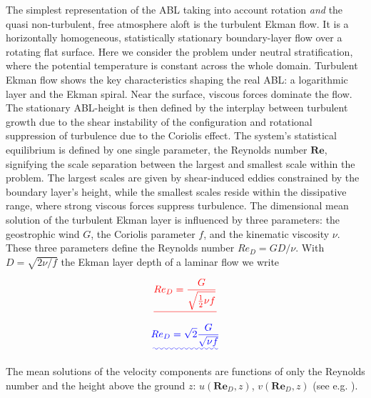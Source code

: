\documentclass[a4paper,11pt]{article}
\newcommand{\RE}{\mathbf{Re}}
\providecommand{\DIFadd}[1]{{\protect\color{blue}\uwave{#1}}} %
\providecommand{\DIFdel}[1]{{\protect\color{red}\sout{#1}}}                      %
\providecommand{\DIFaddbegin}{} %
\providecommand{\DIFaddend}{} %
\providecommand{\DIFdelbegin}{} %
\providecommand{\DIFdelend}{} %
\begin{document}
The simplest representation of the ABL taking into account rotation \emph{and} the quasi non-turbulent, free atmosphere aloft is the turbulent Ekman flow. It is a horizontally homogeneous, statistically stationary boundary-layer flow over a rotating flat surface. Here we consider the problem under neutral stratification, where the potential temperature is constant across the whole domain. Turbulent Ekman flow shows the key characteristics shaping the real ABL: a logarithmic layer and the Ekman spiral. Near the surface, viscous forces dominate the flow. The stationary ABL-height is then defined by the interplay between turbulent growth due to the shear instability of the configuration \citep{lilly1966instability} and rotational suppression of turbulence due to the Coriolis effect. The system's statistical equilibrium is defined by one single parameter, the Reynolds number $\RE$, signifying the scale separation between the largest and smallest scale within the problem. The largest scales are given by shear-induced eddies constrained by the boundary layer's height, while the smallest scales reside within the dissipative range, where strong viscous forces suppress turbulence. The dimensional mean solution of the turbulent Ekman layer is influenced by three parameters: the geostrophic wind $G$, the Coriolis parameter $f$, and the kinematic viscosity $\nu$. These three parameters define the Reynolds number $Re_D = GD/\nu$. With $D=\sqrt{2\nu/f}$ the Ekman layer depth of a laminar flow we write

\DIFdelbegin \begin{align*}\DIFdel{%
 Re_D = \frac{G}{\sqrt{\frac{1}{2}\nu f}}
}\end{align*}%
\DIFdelend \DIFaddbegin \begin{align}\DIFadd{\label{red}
 Re_D = \sqrt{2}\frac{G}{\sqrt{\nu f}}
}\end{align}\DIFaddend 

The mean solutions of the velocity components are functions of only the Reynolds number and the height above the ground $z$: $u(\RE_D,z)$, $v(\RE_D,z)$ (see e.g. \cite{csanady1967resistance}).
\end{document}
